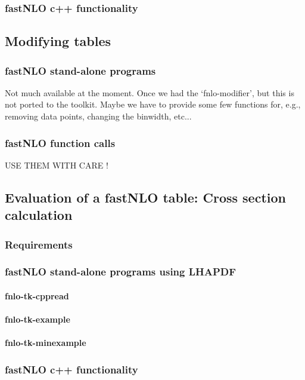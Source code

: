 \documentclass[a4paper,11pt]{article}
\begin{document}
\subsubsection{fastNLO c++ functionality}

\subsection{Modifying tables}
\subsubsection{fastNLO stand-alone programs}
Not much available at the moment. Once we had the `fnlo-modifier', but this is not ported to the toolkit.
Maybe we have to provide some few functions for, e.g., removing data points, changing the binwidth, etc...
\subsubsection{fastNLO function calls}
USE THEM WITH CARE !

\subsection{Evaluation of a fastNLO table: Cross section calculation}
\subsubsection{Requirements}
\subsubsection{fastNLO stand-alone programs using LHAPDF}
\paragraph{fnlo-tk-cppread}
\paragraph{fnlo-tk-example}

\paragraph{fnlo-tk-minexample}

\subsubsection{fastNLO c++ functionality}
\end{document}
